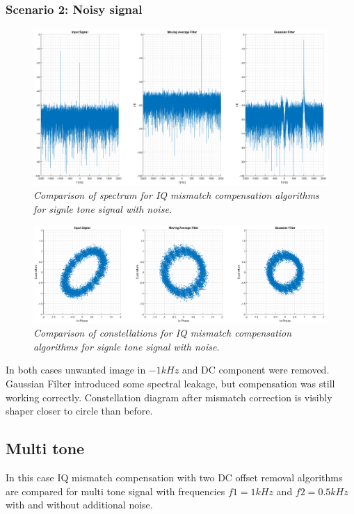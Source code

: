 \documentclass[en,printmode]{mgr}
\begin{document}
		\subsubsection*{Scenario 2: Noisy signal}
			\vspace{1cm}
			\begin{figure}[H]
    			\centering
   				\includegraphics[width=\textwidth]{plots/single_nf.png}
   		 		\caption{\textit{Comparison of spectrum for IQ mismatch compensation algorithms 
   		 		for signle tone signal with noise.}}
   		 	\end{figure}	
   		 	\vspace{2cm}
   		 	\begin{figure}[H]
    			\centering
   				\includegraphics[width=\textwidth]{plots/single_nc.png}
   		 		\caption{\textit{Comparison of constellations for IQ mismatch compensation algorithms 
   		 		for signle tone signal with noise.}}
   		 	\end{figure}
   		 	
   		 	In both cases unwanted image in $-1kHz$ and DC component were removed.
   		 	Gaussian Filter introduced some spectral leakage, but compensation was still
   		 	working correctly. Constellation diagram after mismatch correction is visibly
   		 	shaper closer to circle than before. 
   	\newpage
   	\subsection*{Multi tone}
   		In this case IQ mismatch compensation with two DC offset removal algorithms are compared for
		multi tone signal with frequencies $f1=1kHz$ and $f2=0.5kHz$ with and without additional noise.
\end{document}
